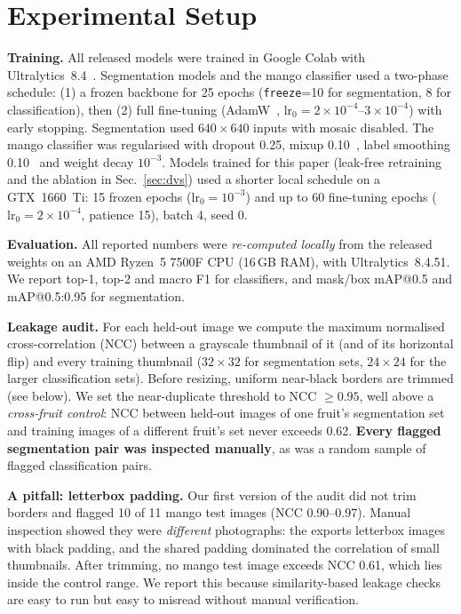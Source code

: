 \documentclass[10pt,twocolumn]{article}
\begin{document}
\section{Experimental Setup}
\textbf{Training.} All released models were trained in Google Colab with Ultralytics~8.4~\cite{jocher2023yolov8}. Segmentation models and the mango classifier used a two-phase schedule: (1) a frozen backbone for 25 epochs (\texttt{freeze}=10 for segmentation, 8 for classification), then (2) full fine-tuning (AdamW~\cite{loshchilov2019adamw}, $\text{lr}_0 = 2\!\times\!10^{-4}$--$3\!\times\!10^{-4}$) with early stopping. Segmentation used $640\times640$ inputs with mosaic disabled. The mango classifier was regularised with dropout 0.25, mixup 0.10~\cite{zhang2018mixup}, label smoothing 0.10~\cite{szegedy2016} and weight decay $10^{-3}$. Models trained for this paper (leak-free retraining and the ablation in Sec.~\ref{sec:dvs}) used a shorter local schedule on a GTX~1660~Ti: 15 frozen epochs ($\text{lr}_0=10^{-3}$) and up to 60 fine-tuning epochs ($\text{lr}_0=2\times10^{-4}$, patience 15), batch 4, seed 0.

\textbf{Evaluation.} All reported numbers were \emph{re-computed locally} from the released weights on an AMD Ryzen~5 7500F CPU (16\,GB RAM), with Ultralytics~8.4.51. We report top-1, top-2 and macro F1 for classifiers, and mask/box mAP@0.5 and mAP@0.5:0.95 for segmentation.

\textbf{Leakage audit.} For each held-out image we compute the maximum normalised cross-correlation (NCC) between a grayscale thumbnail of it (and of its horizontal flip) and every training thumbnail ($32\times32$ for segmentation sets, $24\times24$ for the larger classification sets). Before resizing, uniform near-black borders are trimmed (see below). We set the near-duplicate threshold to NCC $\ge 0.95$, well above a \emph{cross-fruit control}: NCC between held-out images of one fruit's segmentation set and training images of a different fruit's set never exceeds 0.62. \textbf{Every flagged segmentation pair was inspected manually}, as was a random sample of flagged classification pairs.

\textbf{A pitfall: letterbox padding.} Our first version of the audit did not trim borders and flagged 10 of 11 mango test images (NCC 0.90--0.97). Manual inspection showed they were \emph{different} photographs: the exports letterbox images with black padding, and the shared padding dominated the correlation of small thumbnails. After trimming, no mango test image exceeds NCC 0.61, which lies inside the control range. We report this because similarity-based leakage checks are easy to run but easy to misread without manual verification.
\end{document}
